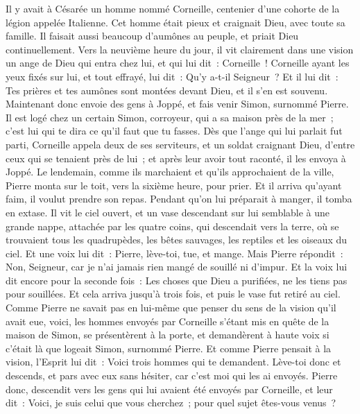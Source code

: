 \begin{multicols}{2}
\VerseOne{}Il y avait à Césarée un homme nommé Corneille, centenier d'une cohorte de la légion appelée Italienne.
Cet homme était pieux et craignait Dieu, avec toute sa famille. Il faisait aussi beaucoup d'aumônes au peuple, et priait Dieu continuellement.
Vers la neuvième heure du jour, il vit clairement dans une vision un ange de Dieu qui entra chez lui, et qui lui dit~: Corneille~!
Corneille ayant les yeux fixés sur lui, et tout effrayé, lui dit~: Qu'y a-t-il Seigneur~? Et il lui dit~: Tes prières et tes aumônes sont montées devant Dieu, et il s'en est souvenu.
Maintenant donc envoie des gens à Joppé, et fais venir Simon, surnommé Pierre.
Il est logé chez un certain Simon, corroyeur, qui a sa maison près de la mer~; c'est lui qui te dira ce qu'il faut que tu fasses.
Dès que l'ange qui lui parlait fut parti, Corneille appela deux de ses serviteurs, et un soldat craignant Dieu, d'entre ceux qui se tenaient près de lui~;
et après leur avoir tout raconté, il les envoya à Joppé.
Le lendemain, comme ils marchaient et qu'ils approchaient de la ville, Pierre monta sur le toit, vers la sixième heure, pour prier.
Et il arriva qu'ayant faim, il voulut prendre son repas. Pendant qu'on lui préparait à manger, il tomba en extase.
Il vit le ciel ouvert, et un vase descendant sur lui semblable à une grande nappe, attachée par les quatre coins, qui descendait vers la terre,
où se trouvaient tous les quadrupèdes, les bêtes sauvages, les reptiles et les oiseaux du ciel.
Et une voix lui dit~: Pierre, lève-toi, tue, et mange.
Mais Pierre répondit~: Non, Seigneur, car je n'ai jamais rien mangé de souillé ni d'impur.
Et la voix lui dit encore pour la seconde fois~: Les choses que Dieu a purifiées, ne les tiens pas pour souillées.
Et cela arriva jusqu'à trois fois, et puis le vase fut retiré au ciel.
Comme Pierre ne savait pas en lui-même que penser du sens de la vision qu'il avait eue, voici, les hommes envoyés par Corneille s'étant mis en quête de la maison de Simon, se présentèrent à la porte,
et demandèrent à haute voix si c'était là que logeait Simon, surnommé Pierre.
Et comme Pierre pensait à la vision, l'Esprit lui dit~: Voici trois hommes qui te demandent.
Lève-toi donc et descends, et pars avec eux sans hésiter, car c'est moi qui les ai envoyés.
Pierre donc, descendit vers les gens qui lui avaient été envoyés par Corneille, et leur dit~: Voici, je suis celui que vous cherchez~; pour quel sujet êtes-vous venus~?

\end{multicols}
